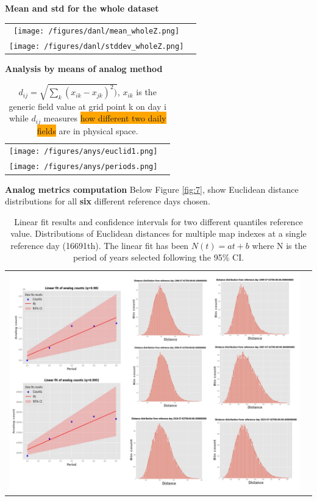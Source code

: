 \documentclass[9pt]{beamer}
\begin{document}
\begin{frame}[allowframebreaks]{\textbf{Mean and std for the whole dataset}}
\begin{table}
    \centering
    \begin{tabular}{cc}
        \texttt{[image: /figures/danl/mean\_wholeZ.png]} \\ 
        \texttt{[image: /figures/danl/stddev\_wholeZ.png]} \\ 
    \end{tabular}
    \label{fig:4}
\end{table}
\end{frame}

\begin{frame}[allowframebreaks]{\textbf{Analysis by means of analog method}}
\begin{table}
    \centering
    \begin{tabular}{cc}
        \texttt{[image: /figures/anys/euclid1.png]} \\
        \texttt{[image: /figures/anys/periods.png]} 
    \end{tabular}
    \label{fig:5}
    \caption{$d_{ij}= \sqrt{\sum_k (x_{ik} -x_{jk})^2)}$, $x_{ik}$ is the generic field value at grid point k on day i while $d_{ij}$ measures \colorbox{orange}{how different two daily fields} are in physical space.}
\end{table}
\end{frame}

\begin{frame}{\textbf{Analog metrics computation}}
Below Figure \ref{fig:7}, show Euclidean distance distributions for all \textbf{six} different reference days chosen.
\begin{table}
    \centering
    \begin{tabular}{cc}
        \includegraphics[width=0.75\linewidth]{figures/anys/linearfit+distr.png}
    \end{tabular}
    \label{fig:6}
  \caption{Linear fit results and confidence intervals for two different quantiles reference value. Distributions of Euclidean distances for multiple map indexes at a single reference day (16691th). The linear fit has been $N(t) = a t +b$ where N is the period of years selected following the 95\% CI.}
\end{table}
\end{frame}
\end{document}
